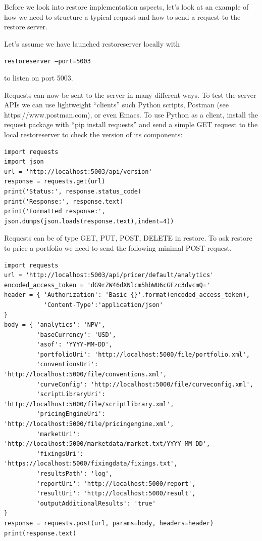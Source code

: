\documentclass[12pt, a4paper]{report}
\begin{document}
Before we look into restore implementation aspects, let's look at an example of how we need to structure a
typical request and how to send a request to the restore server.

Let's assume we have launched restoreserver locally with

\medskip
\centerline{\tt restoreserver ---port=5003}

to listen on port 5003.

Requests can now be sent to the server in many different ways. To test the server APIs we can use
lightweight ``clients'' such Python scripts, Postman (see https://www.postman.com), or even Emacs.
To use Python as a client, install the request package with ``pip install requests'' and send a simple
GET request to the local restoreserver to check the version of its components:

\begin{verbatim}
import requests
import json
url = 'http://localhost:5003/api/version'
response = requests.get(url)
print('Status:', response.status_code)
print('Response:', response.text)
print('Formatted response:', json.dumps(json.loads(response.text),indent=4))
\end{verbatim}

Requests can be of type GET, PUT, POST, DELETE in restore.
To ask restore to price a portfolio we need to send the following minimal POST request.

\begin{verbatim}
import requests
url = 'http://localhost:5003/api/pricer/default/analytics'
encoded_access_token = 'dG9rZW46dXNlcm5hbWU6cGFzc3dvcmQ='
header = { 'Authorization': 'Basic {}'.format(encoded_access_token),
           'Content-Type':'application/json'
}
body = { 'analytics': 'NPV',
         'baseCurrency': 'USD',
         'asof': 'YYYY-MM-DD',
         'portfolioUri': 'http://localhost:5000/file/portfolio.xml',
         'conventionsUri': 'http://localhost:5000/file/conventions.xml',
         'curveConfig': 'http://localhost:5000/file/curveconfig.xml',
         'scriptLibraryUri': 'http://localhost:5000/file/scriptlibrary.xml',
         'pricingEngineUri': 'http://localhost:5000/file/pricingengine.xml',
         'marketUri': 'http://localhost:5000/marketdata/market.txt/YYYY-MM-DD',
         'fixingsUri': 'https://localhost:5000/fixingdata/fixings.txt',
         'resultsPath': 'log',
         'reportUri': 'http://localhost:5000/report',
         'resultUri': 'http://localhost:5000/result',
         'outputAdditionalResults': 'true'
}
response = requests.post(url, params=body, headers=header)
print(response.text)
\end{verbatim}
\end{document}
